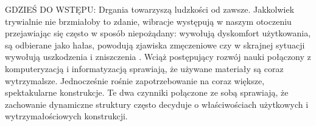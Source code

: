 \begin{table} 
	
	\centering
	\caption{Niepewności najistotniejszych parametrów modeli numerycznych i modalnych na podstawie \cite{Brincker2015}}
	\label{table:uncertainitesModel}
\end{table}



GDZIEŚ DO WSTĘPU: Drgania towarzyszą ludzkości od zawsze. Jakkolwiek trywialnie nie brzmiałoby to zdanie, wibracje występują w naszym otoczeniu przejawiając się często w sposób niepożądany: wywołują dyskomfort użytkowania, są odbierane jako hałas, powodują zjawiska zmęczeniowe czy w skrajnej sytuacji wywołują uszkodzenia i zniszczenia \parencite{Maia1997}. Wciąż postępujący rozwój nauki połączony z komputeryzacją i informatyzacją sprawiają, że używane materiały są coraz wytrzymalsze. Jednocześnie rośnie zapotrzebowanie na coraz większe, spektakularne konstrukcje. Te dwa czynniki połączone ze sobą sprawiają, że zachowanie dynamiczne struktury często decyduje o właściwościach użytkowych i wytrzymałościowych konstrukcji. 


